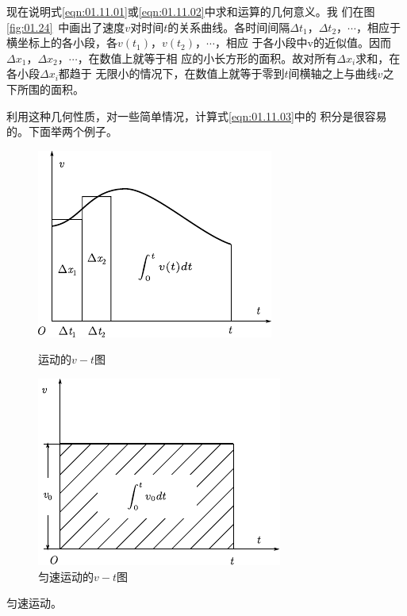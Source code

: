 现在说明式\eqref{eqn:01.11.01}或\eqref{eqn:01.11.02}中求和运算的几何意义。我
们在图\ref{fig:01.24}~中画出了速度$v$对时间$t$的关系曲线。各时间间隔$\Delta t_1$，$\Delta t_2$，$\cdots$，相应于横坐标上的各小段，各$v(t_1)$，$v(t_2)$，$\cdots$，相应
于各小段中v的近似值。因而$\Delta x_1$，$\Delta x_2$，$\cdots$，在数值上就等于相
应的小长方形的面积。故对所有$\Delta x_i$求和，在各小段$\Delta x_i$都趋于
无限小的情况下，在数值上就等于零到$t$间横轴之上与曲线$v$之
下所围的面积。

    利用这种几何性质，对一些简单情况，计算式\eqref{eqn:01.11.03}中的
积分是很容易的。下面举两个例子。
\begin{figure}[!h]
    \begin{minipage}[b]{14em}
        \centering
        \includegraphics{figure/fig01.24}
        \caption{运动的$v-t$图}
        \label{fig:01.24}
    \end{minipage}\hfill
    \begin{minipage}[b]{14em}
        \centering
        \includegraphics{figure/fig01.25}
        \caption{匀速运动的$v-t$图}
        \label{fig:01.25}
    \end{minipage}
\end{figure}

\example 匀速运动。

